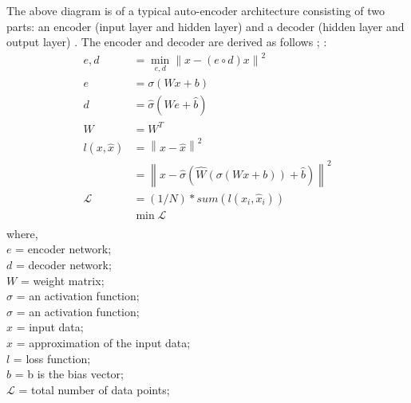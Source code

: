 \documentclass[12pt]{article}
\begin{document}
The above diagram is of a typical auto-encoder architecture consisting of two parts: an encoder (input layer and hidden layer) and a decoder (hidden layer and output layer) \parencite{8780129}. The encoder and decoder are derived as follows \parencite{Sigal_2017}; \parencite{stewart_2023}:
\begin{equation}
  \begin{aligned}
    e,d           & = \min_{e,d}  \left\lVert x-(e\circ d)x \right\rVert^2                           \\
    e             & = \sigma(Wx + b)                                                                 \\
    d             & = \hat{\sigma}(\hat{W}e + \hat{b})                                               \\
    \hat{W}       & = W^{T}                                                                          \\
    l (x,\hat{x}) & = \left\lVert x-\hat{x} \right\rVert ^2                                          \\
                  & = \left\lVert x - \hat{\sigma}(\hat{W}(\sigma(Wx + b))+ \hat{b}) \right\rVert ^2 \\
    \mathcal{L}   & = (1/N) * sum(l(x_i, \hat{x}_i))                                                 \\
                  & \min \mathcal{L}                                                                 \\
  \end{aligned}
\end{equation}
where,\\
$e$ = encoder network; \\
$d$ = decoder network;\\
$W$ = weight matrix;\\
$\sigma$ = an activation function; \\
$\hat{\sigma}$ = an activation function; \\
$x$ = input data;\\
$\hat{x}$ = approximation of the input data;\\
$l$ = loss function; \\
$b$ = b is the bias vector;\\
$\mathcal{L}$ = total number of data points;\\
\end{document}
